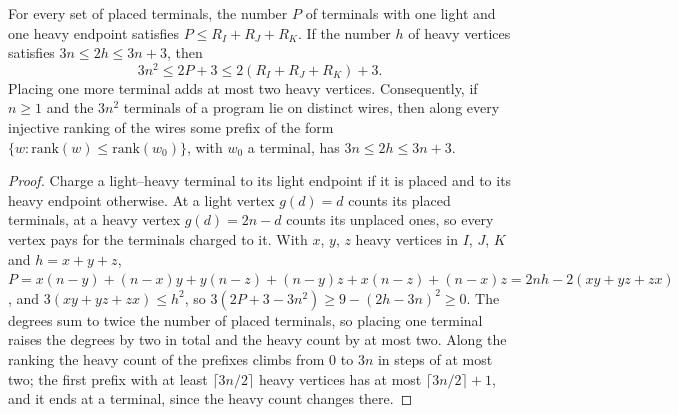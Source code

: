 \begin{lemma}
  \label{lem:lowerbounds-algebraic-mat-mul-charging}
  \leanok
  For every set of placed terminals, the number $P$ of terminals with one
  light and one heavy endpoint satisfies $P\le R_I+R_J+R_K$. If the number
  $h$ of heavy vertices satisfies $3n\le2h\le3n+3$, then
  \[
    3n^2 \le 2P + 3 \le 2(R_I+R_J+R_K) + 3 .
  \]
  Placing one more terminal adds at most two heavy vertices. Consequently,
  if $n\ge1$ and the $3n^2$ terminals of a program lie on distinct wires,
  then along every injective ranking of the wires some prefix of the form
  $\{w : \mathrm{rank}(w)\le\mathrm{rank}(w_0)\}$, with $w_0$ a terminal,
  has $3n\le2h\le3n+3$.
\end{lemma}
\begin{proof}
  \leanok
  Charge a light--heavy terminal to its light endpoint if it is placed and
  to its heavy endpoint otherwise. At a light vertex $g(d)=d$ counts its
  placed terminals, at a heavy vertex $g(d)=2n-d$ counts its unplaced
  ones, so every vertex pays for the terminals charged to it. With $x$, $y$,
  $z$ heavy vertices in $I$, $J$, $K$ and $h=x+y+z$,
  $P=x(n-y)+(n-x)y+y(n-z)+(n-y)z+x(n-z)+(n-x)z=2nh-2(xy+yz+zx)$, and
  $3(xy+yz+zx)\le h^2$, so
  $3(2P+3-3n^2)\ge9-(2h-3n)^2\ge0$. The degrees sum to twice the number of
  placed terminals, so placing one terminal raises the degrees by two in
  total and the heavy count by at most two. Along the ranking the heavy
  count of the prefixes climbs from $0$ to $3n$ in steps of at most two; the
  first prefix with at least $\lceil3n/2\rceil$ heavy vertices has at most
  $\lceil3n/2\rceil+1$, and it ends at a terminal, since the heavy count
  changes there.
\end{proof}

